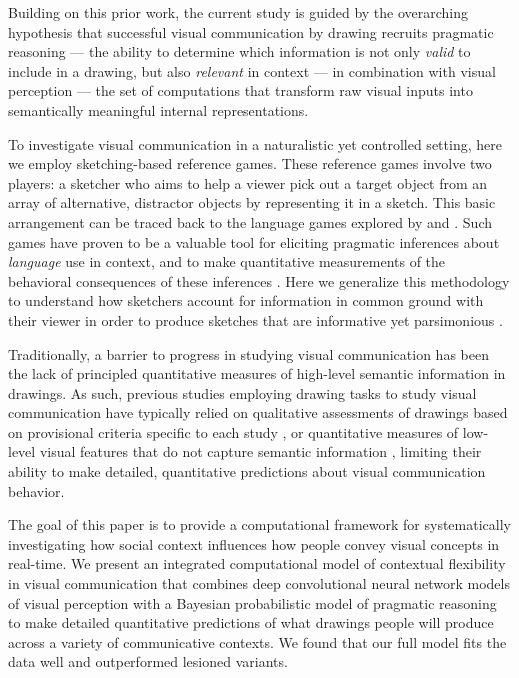 \documentclass[9pt,twocolumn,twoside]{pnas-new}
\begin{document}
Building on this prior work, the current study is guided by the overarching hypothesis that successful visual communication by drawing recruits pragmatic reasoning \cite{goodman2016pragmatic,clark1996using,wilson1986relevance,grice1975syntax} --- the ability to determine which information is not only \textit{valid} to include in a drawing, but also \textit{relevant} in context --- in combination with visual perception --- the set of computations that transform raw visual inputs into semantically meaningful internal representations.

To investigate visual communication in a naturalistic yet controlled setting, here we employ sketching-based reference games. These reference games involve two players: a sketcher who aims to help a viewer pick out a target object from an array of alternative, distractor objects by representing it in a sketch. This basic arrangement can be traced back to the language games explored by \citep{wittgenstein1953philosophical} and \citep{Lewis69_Convention}. Such games have proven to be a valuable tool for eliciting pragmatic inferences about \textit{language} use in context, and to make quantitative measurements of the behavioral consequences of these inferences \cite{goodman2016pragmatic,kao2014formalizing,goodman2013knowledge,frank2012predicting}. Here we generalize this methodology to understand how sketchers account for information in common ground with their viewer in order to produce sketches that are informative \cite{grice1975syntax,wilson1986relevance} yet parsimonious \cite{zipf1936psycho}.

Traditionally, a barrier to progress in studying visual communication has been the lack of principled quantitative measures of high-level semantic information in drawings. As such, previous studies employing drawing tasks to study visual communication have typically relied on qualitative assessments of drawings based on provisional criteria specific to each study \cite{Healey:2007vq}, or quantitative measures of low-level visual features that do not capture semantic information \cite{Garrod:2007wk}, limiting their ability to make detailed, quantitative predictions about visual communication behavior.

The goal of this paper is to provide a computational framework for systematically investigating how social context influences how people convey visual concepts in real-time. We present an integrated computational model of contextual flexibility in visual communication that combines deep convolutional neural network models of visual perception with a Bayesian probabilistic model of pragmatic reasoning \cite{goodman2016pragmatic} to make detailed quantitative predictions of what drawings people will produce across a variety of communicative contexts. We found that our full model fits the data well and outperformed lesioned variants.
\end{document}
